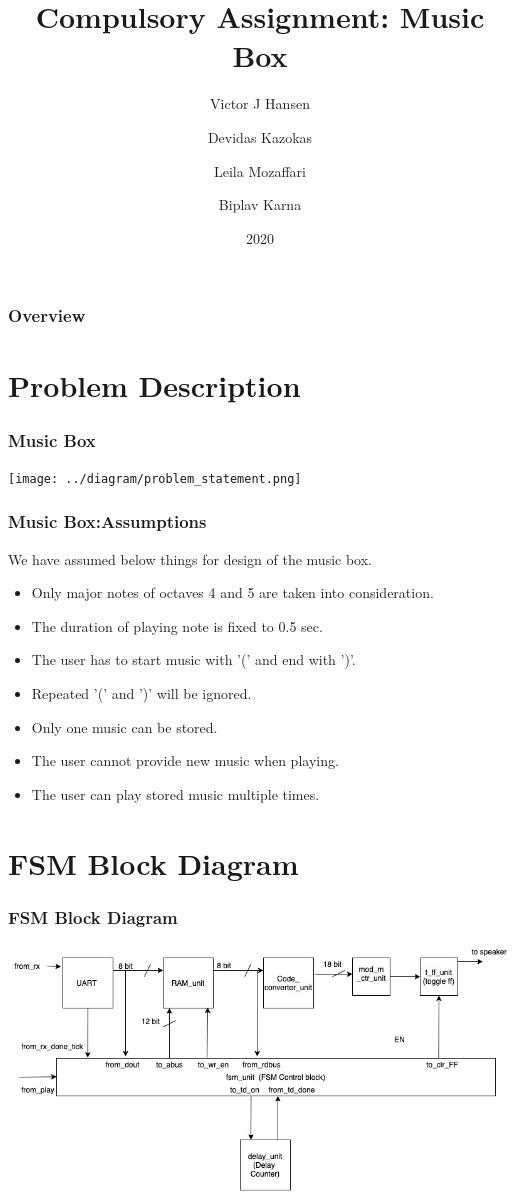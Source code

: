 \documentclass{beamer}
\title{Compulsory Assignment: Music Box}
\author[Victor,Devidas,Leila,Biplav]{Victor J Hansen\inst{1}
\and Devidas Kazokas\inst{2}
\and Leila Mozaffari\inst{3}
\and Biplav Karna\inst{4}
}
\institute{USN Kongsberg}
\date{2020}
\begin{document}
 
\frame{\titlepage}
 
\begin{frame}
\frametitle{Overview}
\tableofcontents
\end{frame}

\section{Problem Description}
\begin{frame}
\frametitle{Music Box}
\texttt{[image: ../diagram/problem\_statement.png]}
\end{frame}
 
\begin{frame}
\frametitle{Music Box:Assumptions}
We have assumed below things for design of the music box.
\begin{itemize}
\item Only major notes of octaves 4 and 5 are taken into consideration.
\item The duration of playing note is fixed to 0.5 sec.
\item The user has to start music with '(' and end with ')'.
\item Repeated '(' and ')' will be ignored.
\item Only one music can be stored.
\item The user cannot provide new music when playing.
\item The user can play stored music multiple times.
\end {itemize}
\end{frame}

\section{FSM Block Diagram}
\begin{frame}
\frametitle{FSM Block Diagram}
\includegraphics[width=\textwidth,height=0.8\textheight] {../diagram/ccw_music_player-fsm_block_diagram.jpg}
\end{frame}
 
\end{document}
